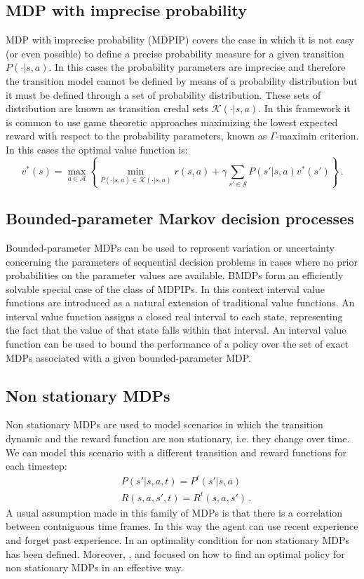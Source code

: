 \subsection{MDP with imprecise probability}
MDP with imprecise probability (MDPIP) \citep{harmanec_generalizing_2002} covers the case in which it is not easy (or even possible) to define a precise probability measure for a given transition $P(\cdot | s, a)$. In this cases the probability parameters are imprecise and therefore the transition model cannot be defined by means of a probability distribution but it must be defined through a set of probability distribution. These sets of distribution are known as transition credal sets $\mathcal{K}(\cdot | s,a)$.\newline
In this framework it is common to use game theoretic approaches maximizing the lowest expected reward with respect to the probability parameters, known as $\Gamma$-maximin criterion. In this cases the optimal value function is:
\begin{equation}
	v^*(s) = \max_{a \in \mathcal{A}} \left\{ \min_{P(\cdot | s,a) \in \mathcal{K}(\cdot | s,a)} r(s,a) + \gamma \sum_{s' \in \mathcal{S}} P(s' | s,a)v^*(s') \right\} \, .
\end{equation} 

\subsection{Bounded-parameter Markov decision processes}
Bounded-parameter MDPs \citep{givan_bounded-parameter_2000} can be used to represent variation or uncertainty concerning the parameters of sequential decision problems in cases where no prior probabilities on the parameter values are available. BMDPs form an efficiently solvable special case of the class of MDPIPs.
In this context interval value functions are introduced as a natural extension of traditional value functions. An interval value function assigns a closed real interval to each state, representing the fact that the value of that state falls within that interval. An interval value function can be used to bound the performance of a policy over the set of exact MDPs associated with a given bounded-parameter MDP.
\subsection{Non stationary MDPs}
Non stationary MDPs \citep{bowerman_1974} are used to model scenarios in which the transition dynamic and the reward function are non stationary, i.e. they change over time. We can model this scenario with a different transition and reward functions for each timestep:
\begin{align}
	&P(s' | s, a, t) = P^t(s' | s,a) \\
	&R(s,a,s',t) = R^t(s,a,s') \, .
\end{align}
A usual assumption made in this family of MDPs is that there is a correlation between contniguous time frames. In this way the agent can use recent experience and forget past experience. In \citep{nonstatmdp} an optimality condition for non stationary MDPs has been defined. Moreover, \citep{GARCIA2000304}, \citep{Cheevaprawatdomrong:2007} and \citep{nonstatmdp2} focused on how to find an optimal policy for non stationary MDPs in an effective way.